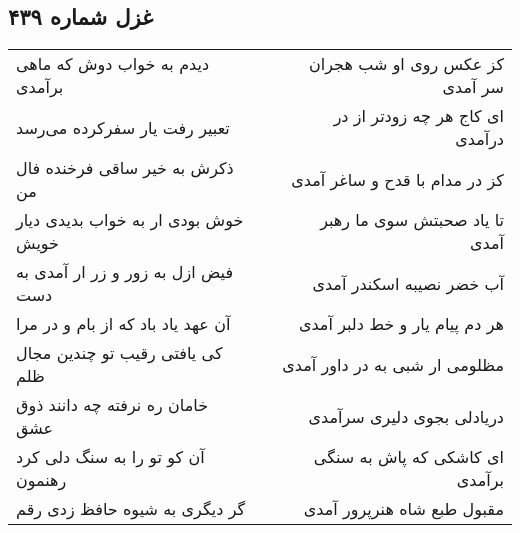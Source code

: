 \begin{center}
\section*{غزل شماره ۴۳۹}
\label{sec:sh439}
\begin{longtable}{l p{0.5cm} r}
دیدم به خواب دوش که ماهی برآمدی
&&
کز عکس روی او شب هجران سر آمدی
\\
تعبیر رفت یار سفرکرده می‌رسد
&&
ای کاج هر چه زودتر از در درآمدی
\\
ذکرش به خیر ساقی فرخنده فال من
&&
کز در مدام با قدح و ساغر آمدی
\\
خوش بودی ار به خواب بدیدی دیار خویش
&&
تا یاد صحبتش سوی ما رهبر آمدی
\\
فیض ازل به زور و زر ار آمدی به دست
&&
آب خضر نصیبه اسکندر آمدی
\\
آن عهد یاد باد که از بام و در مرا
&&
هر دم پیام یار و خط دلبر آمدی
\\
کی یافتی رقیب تو چندین مجال ظلم
&&
مظلومی ار شبی به در داور آمدی
\\
خامان ره نرفته چه دانند ذوق عشق
&&
دریادلی بجوی دلیری سرآمدی
\\
آن کو تو را به سنگ دلی کرد رهنمون
&&
ای کاشکی که پاش به سنگی برآمدی
\\
گر دیگری به شیوه حافظ زدی رقم
&&
مقبول طبع شاه هنرپرور آمدی
\\
\end{longtable}
\end{center}
